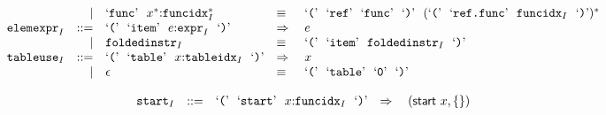 $$\begin{array}[t]{@{}lrrl@{}l@{}l@{}l@{}}
& & | & \mbox{‘\texttt{func}’}~~{x^\ast}{:}{{{\mathtt{funcidx}}}_{I}^\ast} & \quad\equiv\quad{} & \mbox{‘\texttt{{(}}’}~~\mbox{‘\texttt{ref}’}~~\mbox{‘\texttt{func}’}~~\mbox{‘\texttt{{)}}’}~~{(\mbox{‘\texttt{{(}}’}~~\mbox{‘\texttt{ref.func}’}~~{{\mathtt{funcidx}}}_{I}~~\mbox{‘\texttt{{)}}’})^\ast} \\
& {{\mathtt{elemexpr}}}_{I} & ::= & \mbox{‘\texttt{{(}}’}~~\mbox{‘\texttt{item}’}~~e{:}{{\mathtt{expr}}}_{I}~~\mbox{‘\texttt{{)}}’} & \quad\Rightarrow\quad{} & e \\
& & | & {{\mathtt{foldedinstr}}}_{I} & \quad\equiv\quad{} & \mbox{‘\texttt{{(}}’}~~\mbox{‘\texttt{item}’}~~{{\mathtt{foldedinstr}}}_{I}~~\mbox{‘\texttt{{)}}’} \\
& {{\mathtt{tableuse}}}_{I} & ::= & \mbox{‘\texttt{{(}}’}~~\mbox{‘\texttt{table}’}~~x{:}{{\mathtt{tableidx}}}_{I}~~\mbox{‘\texttt{{)}}’} & \quad\Rightarrow\quad{} & x \\
& & | & \epsilon & \quad\equiv\quad{} & \mbox{‘\texttt{{(}}’}~~\mbox{‘\texttt{table}’}~~\mbox{‘\texttt{0}’}~~\mbox{‘\texttt{{)}}’} \\
\end{array}
$$

\vspace{1ex}

$$
\begin{array}[t]{@{}lrrl@{}l@{}l@{}l@{}}
& {{\mathtt{start}}}_{I} & ::= & \mbox{‘\texttt{{(}}’}~~\mbox{‘\texttt{start}’}~~x{:}{{\mathtt{funcidx}}}_{I}~~\mbox{‘\texttt{{)}}’} & \quad\Rightarrow\quad{} & (\mathsf{start}~x, \{  \}) \\
\end{array}
$$

\vspace{1ex}

